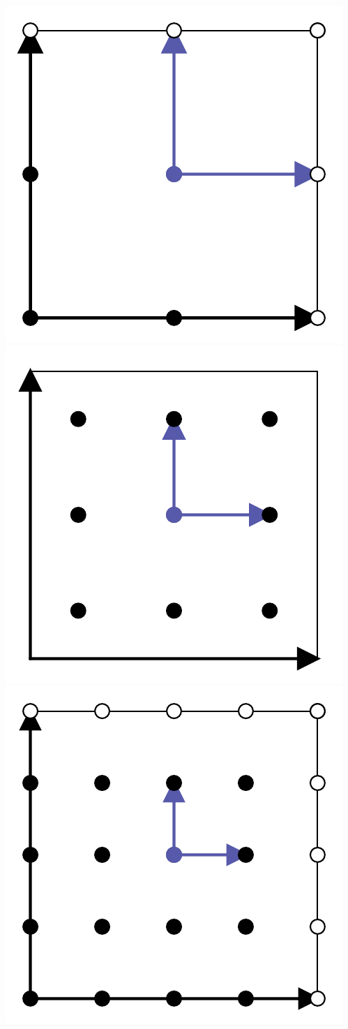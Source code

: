 \begin{marginfigure}[0cm]
	\centering
	\includegraphics[width=.8\textwidth]{./data/sketches/2_sc.pdf}
	\hfill
	\includegraphics[width=.8\textwidth]{./data/sketches/3_sc.pdf}
	\hfill
	\includegraphics[width=.8\textwidth]{./data/sketches/4_sc.pdf}

\end{marginfigure}
